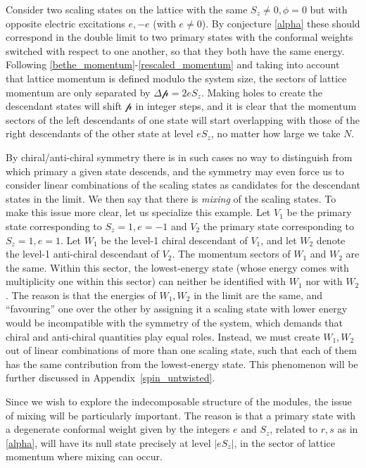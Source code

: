 \documentclass[a4paper,10pt]{article}
\newcommand{\Pscaled}{{\mathcal p}}
\begin{document}
Consider two scaling states on the lattice with the same $S_z \neq 0, \phi = 0$ but with opposite electric excitations $e,-e$ (with $e\neq 0$). By conjecture \eqref{alpha} these should correspond in the double limit to two primary states with the conformal weights switched with respect to one another, so that they both have the same energy. 
%
Following \eqref{bethe_momentum}-\eqref{rescaled_momentum} and taking into account that lattice momentum is defined modulo the system size, the sectors of lattice momentum are only separated by $\Delta \Pscaled  = 2 e S_z$. Making holes to create the descendant states will shift $\Pscaled$ in integer steps, and it is clear that  the momentum sectors of the left descendants of one state will start overlapping with those of the right descendants of the other state at level $e S_z$, no matter how large we take $N$. 

By chiral/anti-chiral symmetry there is in such cases no way to distinguish from which primary a given state descends, and the symmetry may even force us to consider linear combinations of the scaling states as candidates for the descendant states in the limit. We then say that there is \emph{mixing} of the scaling states. To make this issue more clear, let us specialize this example. Let $V_1$ be the primary state corresponding to $S_z=1, e=-1$ and $V_2$ the primary state corresponding to $S_z =1, e = 1$. Let $W_1$ be the level-1 chiral descendant of $V_1$, and let $W_2$ denote the level-1 anti-chiral descendant of $V_2$. The momentum sectors of $W_1$ and $W_2$ are the same. Within this sector, the lowest-energy state (whose energy comes with multiplicity one within this sector) can neither be identified with $W_1$ nor with $W_2$. The reason is that the energies of $W_1,W_2$ in the limit are the same, and ``favouring'' one over the other by assigning it a scaling state with lower energy would be incompatible with the symmetry of the system, which demands that chiral and anti-chiral quantities play equal roles. Instead, we must create $W_1,W_2$ out of linear combinations of more than one scaling state, such that each of them has the same contribution from the lowest-energy state. This phenomenon will be further discussed in Appendix~\ref{spin_untwisted}.


Since we wish to explore the indecomposable structure of the modules, the issue of mixing will be particularly important. The reason is that a primary state with a degenerate conformal weight given by the integers $e$ and $S_z$, related to $r,s$ as in \eqref{alpha}, will have its null state precisely at level $|eS_z|$, in the sector of lattice momentum where mixing can occur. 
\end{document}

